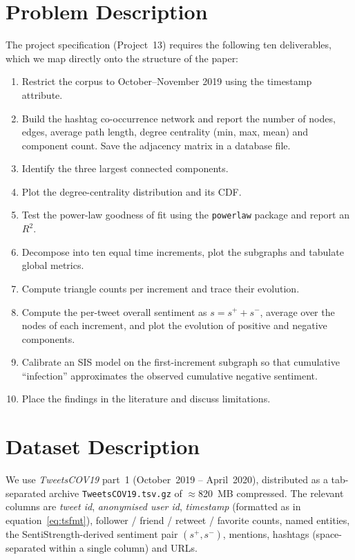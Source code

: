 \documentclass[conference]{IEEEtran}
\begin{document}
\section{Problem Description}
\label{sec:problem}
The project specification (Project~13) requires the following
ten deliverables, which we map directly onto the structure of
the paper:
\begin{enumerate}
  \item Restrict the corpus to October--November 2019 using the
        timestamp attribute.
  \item Build the hashtag co-occurrence network and report the
        number of nodes, edges, average path length, degree
        centrality (min, max, mean) and component count.  Save
        the adjacency matrix in a database file.
  \item Identify the three largest connected components.
  \item Plot the degree-centrality distribution and its CDF.
  \item Test the power-law goodness of fit using the
        \texttt{powerlaw} package and report an $R^{2}$.
  \item Decompose into ten equal time increments, plot the
        subgraphs and tabulate global metrics.
  \item Compute triangle counts per increment and trace their
        evolution.
  \item Compute the per-tweet overall sentiment as
        $s = s^{+} + s^{-}$, average over the nodes of each
        increment, and plot the evolution of positive and
        negative components.
  \item Calibrate an SIS model on the first-increment subgraph so
        that cumulative ``infection'' approximates the observed
        cumulative negative sentiment.
  \item Place the findings in the literature and discuss
        limitations.
\end{enumerate}

\section{Dataset Description}
\label{sec:data}
We use \textit{TweetsCOV19} part~1 (October~2019 -- April~2020),
distributed as a tab-separated archive
\texttt{TweetsCOV19.tsv.gz} of $\approx$820~MB compressed.  The
relevant columns are \textit{tweet id}, \textit{anonymised user
id}, \textit{timestamp} (formatted as in
equation~\eqref{eq:tsfmt}), follower / friend / retweet /
favorite counts, named entities, the SentiStrength-derived
sentiment pair $(s^{+}, s^{-})$, mentions, hashtags
(space-separated within a single column) and URLs.
\end{document}
